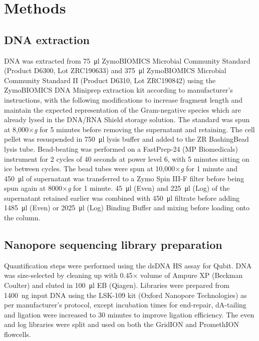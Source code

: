 \documentclass[a4paper,num-refs]{oup-contemporary}
\begin{document}
\section{Methods}

\subsection{DNA extraction}

DNA was extracted from \SI{75}{\micro\litre} ZymoBIOMICS Microbial Community Standard (Product D6300, Lot ZRC190633) and \SI{375}{\micro\litre} ZymoBIOMICS Microbial Community Standard II (Product D6310, Lot ZRC190842) using the ZymoBIOMICS DNA Miniprep extraction kit according to manufacturer's instructions, with the following modifications to increase fragment length and maintain the expected representation of the Gram-negative species which are already lysed in the DNA/RNA Shield storage solution.
The standard was spun at 8,000$\times$\textit{g} for 5 minutes before removing the supernatant and retaining. The cell pellet was resuspended in \SI{750}{\micro\litre} lysis buffer and added to the ZR BashingBead lysis tube. Bead-beating was performed on a FastPrep-24 (MP Biomedicals) instrument for 2 cycles of 40 seconds at power level 6, with 5 minutes sitting on ice between cycles. The bead tubes were spun at 10,000$\times$\textit{g} for 1 minute and \SI{450}{\micro\litre} of supernatant was transferred to a Zymo Spin III-F filter before being spun again at 8000$\times$\textit{g} for 1 minute.
\SI{45}{\micro\litre} (Even) and \SI{225}{\micro\litre} (Log) of the supernatant retained earlier was combined with \SI{450}{\micro\litre} filtrate before adding \SI{1485}{\micro\litre} (Even) or \SI{2025}{\micro\litre} (Log) Binding Buffer and mixing before loading onto the column.

\subsection{Nanopore sequencing library preparation}

Quantification steps were performed using the dsDNA HS assay for Qubit. 
DNA was size-selected by cleaning up with 0.45$\times$ volume of Ampure XP (Beckman Coulter) and eluted in \SI{100}{\micro\litre} EB (Qiagen). Libraries were prepared from \SI{1400}{\nano\gram} input DNA using the LSK-109 kit (Oxford Nanopore Technologies) as per manufacturer's protocol, except incubation times for end-repair, dA-tailing and ligation were increased to 30 minutes to improve ligation efficiency. The even and log libraries were split and used on both the GridION and PromethION flowcells.
\end{document}

